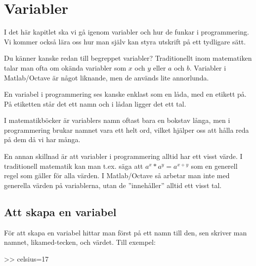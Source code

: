 %
%
\chapter{Variabler}\label{ch:variabler}

I det här kapitlet ska vi gå igenom variabler och hur de funkar i programmering. Vi kommer också lära oss hur man själv kan styra utskrift på ett tydligare sätt.

Du känner kanske redan till begreppet variabler? Traditionellt inom matematiken talar man ofta om okända variabler som $x$ och $y$ eller $a$ och $b$. Variabler i Matlab/Octave är något liknande, men de används lite annorlunda.

En variabel i programmering ses kanske enklast som en låda, med en etikett på. På etiketten står det ett namn och i lådan ligger det ett tal.

I matematikböcker är variablers namn oftast bara en bokstav långa, men i programmering brukar namnet vara ett helt ord, vilket hjälper oss att hålla reda på dem då vi har många.

En annan skillnad är att variabler i programmering alltid har ett visst värde. I traditionell matematik kan man t.ex. säga att $a^x*a^y=a^{x+y}$ som en generell regel som gäller för alla värden. I Matlab/Octave så arbetar man inte med generella värden på variablerna, utan de ''innehåller'' alltid ett visst tal.


\section{Att skapa en variabel}
För att skapa en variabel hittar man först på ett namn till den, sen skriver man namnet, likamed-tecken, och värdet. Till exempel:
\begin{matlab}[caption={Skapa variabeln celsius},label={}]
>> celsius=17
\end{matlab}

